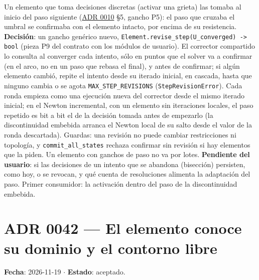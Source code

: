 \documentclass[11pt,oneside]{report}
\begin{document}
Un elemento que toma decisiones discretas (activar una grieta) las tomaba al inicio del paso siguiente (\hyperref[adr:0010]{ADR 0010} §5, gancho P5): el paso que cruzaba el umbral se confirmaba con el elemento intacto, por encima de su resistencia. \textbf{Decisión}: un gancho genérico nuevo, \texttt{Element.\allowbreak{}revise\_\allowbreak{}step(U\_\allowbreak{}converged) -\textgreater{} bool} (pieza P9 del contrato con los módulos de usuario). El corrector compartido lo consulta al converger cada intento, sólo en puntos que el solver va a confirmar (en el arco, no en un paso que rebasa el final), y antes de confirmar; si algún elemento cambió, repite el intento desde su iterado inicial, en cascada, hasta que ninguno cambia o se agota \texttt{MAX\_\allowbreak{}STEP\_\allowbreak{}REVISIONS} (\texttt{StepRevisionError}). Cada ronda empieza como una ejecución nueva del corrector desde el mismo iterado inicial; en el Newton incremental, con un elemento sin iteraciones locales, el paso repetido es bit a bit el de la decisión tomada antes de empezarlo (la discontinuidad embebida arranca el Newton local de su salto desde el valor de la ronda descartada). Guardas: una revisión no puede cambiar restricciones ni topología, y \texttt{commit\_\allowbreak{}all\_\allowbreak{}states} rechaza confirmar sin revisión si hay elementos que la piden. Un elemento con ganchos de paso no va por lotes. \textbf{Pendiente del usuario}: si las decisiones de un intento que se abandona (bisección) persisten, como hoy, o se revocan, y qué cuenta de resoluciones alimenta la adaptación del paso. Primer consumidor: la activación dentro del paso de la discontinuidad embebida.

\section{ADR 0042 --- El elemento conoce su dominio y el contorno libre}
\label{adr:0042}

\textbf{Fecha}: 2026-11-19 \ensuremath{\cdot} \textbf{Estado}: aceptado.
\end{document}
